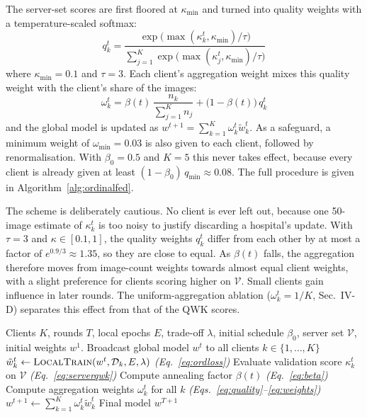 The server-set scores are first floored at $\kappa_{\min}$ and turned into quality
weights with a temperature-scaled softmax:
\begin{equation}
q_k^t = \frac{\exp\!\big(\max(\kappa_k^t, \kappa_{\min}) / \tau\big)}
             {\sum_{j=1}^{K} \exp\!\big(\max(\kappa_j^t, \kappa_{\min}) / \tau\big)}
\label{eq:quality}
\end{equation}
where $\kappa_{\min} = 0.1$ and $\tau = 3$. Each client's aggregation weight mixes
this quality weight with the client's share of the images:
\begin{equation}
\omega_k^t = \beta(t)\,\frac{n_k}{\sum_{j=1}^{K} n_j}
           + \big(1 - \beta(t)\big)\, q_k^t
\label{eq:weights}
\end{equation}
and the global model is updated as $w^{t+1} = \sum_{k=1}^{K} \omega_k^t \tilde{w}_k^t$.
As a safeguard, a minimum weight of $\omega_{\min} = 0.03$ is also given to each
client, followed by renormalisation. With $\beta_0 = 0.5$ and $K = 5$ this never
takes effect, because every client is already given at least
$(1-\beta_0)\,q_{\min} \approx 0.08$. The full procedure is given in
Algorithm~\ref{alg:ordinalfed}.

The scheme is deliberately cautious. No client is ever left out, because one
50-image estimate of $\kappa_k^t$ is too noisy to justify discarding a hospital's
update. With $\tau = 3$ and $\kappa \in [0.1, 1]$, the quality weights
$q_k^t$ differ from each other by at most a factor of $e^{0.9/3} \approx 1.35$, so
they are close to equal. As $\beta(t)$ falls, the aggregation therefore moves from
image-count weights towards almost equal client weights, with a slight preference
for clients scoring higher on $\mathcal{V}$. Small clients gain influence in
later rounds. The uniform-aggregation ablation ($\omega_k^t = 1/K$, Sec.~IV-D)
separates this effect from that of the QWK scores.

\begin{algorithm}[t]
\caption{OrdinalFed Training Pipeline}
\label{alg:ordinalfed}
\small
\begin{algorithmic}[1]
\REQUIRE Clients $K$, rounds $T$, local epochs $E$, trade-off $\lambda$,
         initial schedule $\beta_0$, server set $\mathcal{V}$, initial weights $w^1$.
  \STATE Broadcast global model $w^t$ to all clients $k \in \{1,\ldots,K\}$
    \STATE $\tilde{w}_k^t \leftarrow \textsc{LocalTrain}(w^t, \mathcal{D}_k, E, \lambda)$
           \hfill\textit{(Eq.~\ref{eq:ordloss})}
    \STATE Evaluate validation score $\kappa_k^t$ on $\mathcal{V}$
           \hfill\textit{(Eq.~\ref{eq:serverqwk})}
  \ENDFOR
  \STATE Compute annealing factor $\beta(t)$
         \hfill\textit{(Eq.~\ref{eq:beta})}
  \STATE Compute aggregation weights $\omega_k^t$ for all $k$
         \hfill\textit{(Eqs.~\ref{eq:quality}--\ref{eq:weights})}
  \STATE $w^{t+1} \leftarrow \sum_{k=1}^{K} \omega_k^t \tilde{w}_k^t$
\ENDFOR
\RETURN Final model $w^{T+1}$
\end{algorithmic}
\end{algorithm}

